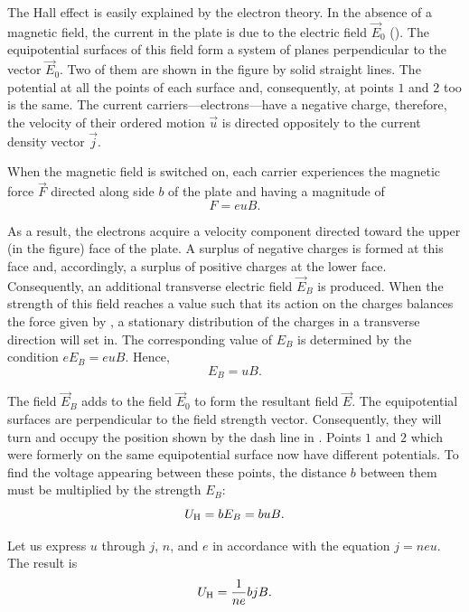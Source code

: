 The Hall effect is easily explained by the electron theory.
In the absence of a magnetic field, the current in the plate is due to the electric field $\vec{E}_0$ ().
The equipotential surfaces of this field form a system of planes perpendicular to the vector $\vec{E}_0$.
Two of them are shown in the figure by solid straight lines.
The potential at all the points of each surface and, consequently, at points $1$ and $2$ too is the same.
The current carriers---electrons---have a negative charge, therefore, the velocity of their ordered motion $\vec{u}$ is directed oppositely to the current density vector $\vec{j}$.

When the magnetic field is switched on, each carrier experiences the magnetic force $\vec{F}$ directed along side $b$ of the plate and having a magnitude of
\begin{equation}\label{eq:11_14}
    F = euB.
\end{equation}

\noindent
As a result, the electrons acquire a velocity component directed toward the upper (in the figure) face of the plate.
A surplus of negative charges is formed at this face and, accordingly, a surplus of positive charges at the lower face.
Consequently, an additional transverse electric field $\vec{E}_B$ is produced.
When the strength of this field reaches a value such that its action on the charges balances the force given by , a stationary distribution of the charges in a transverse direction will set in.
The corresponding value of $E_B$ is determined by the condition $eE_B = euB$.
Hence,
\begin{equation*}
    E_B = uB.
\end{equation*}

The field $\vec{E}_B$ adds to the field $\vec{E}_0$ to form the resultant field $\vec{E}$.
The equipotential surfaces are perpendicular to the field strength vector.
Consequently, they will turn and occupy the position shown by the dash line in .
Points $1$ and $2$ which were formerly on the same equipotential surface now have different potentials.
To find the voltage appearing between these points, the distance $b$ between them must be multiplied by the strength $E_B$:
\begin{equation*}
    U_{\text{H}} = b E_B = b u B.
\end{equation*}

\noindent
Let us express $u$ through $j$, $n$, and $e$ in accordance with the equation $j = neu$.
The result is
\begin{equation}\label{eq:11_15}
    U_{\text{H}} = \frac{1}{ne} b j B.
\end{equation}

